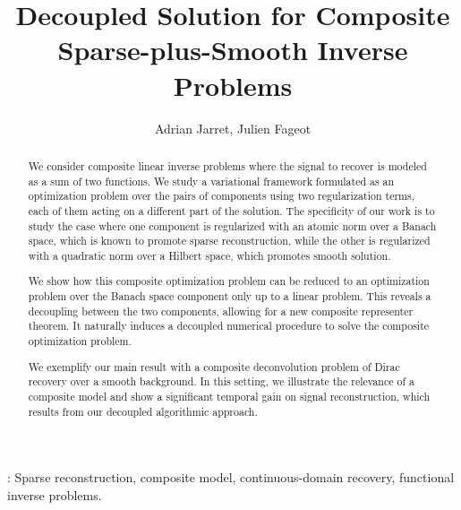 \documentclass[12pt]{article}
\title{Decoupled Solution for Composite Sparse-plus-Smooth Inverse Problems}
\author{Adrian Jarret, Julien Fageot}
\date{}
\begin{document}
\maketitle

\begin{abstract}
    We consider composite linear inverse problems where the signal to recover is modeled as a sum of two functions. 
    We study a variational framework formulated as an optimization problem over the pairs of components using two regularization terms, each of them acting on a different part of the solution.
    The specificity of our work is to study the case where one component is regularized with an atomic norm over a Banach space, which is known to promote sparse reconstruction, while the other is regularized with a quadratic norm over a Hilbert space, which promotes smooth solution.

    We show how this composite optimization problem can be reduced to an optimization problem over the Banach space component only up to a linear problem.
    This reveals a decoupling between the two components, allowing for a new composite representer theorem.
    It naturally induces a decoupled numerical procedure to solve the composite optimization problem.

    We exemplify our main result with a composite deconvolution problem of Dirac recovery over a smooth background. In this setting, we illustrate the relevance of a composite model and show a significant temporal gain on signal reconstruction, which results from our decoupled algorithmic approach.

\end{abstract}

: Sparse reconstruction, composite model, continuous-domain recovery, functional inverse problems. 
\end{document}
